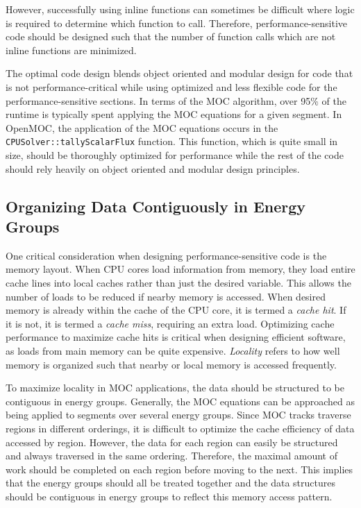 However, successfully using inline functions can sometimes be difficult where logic is required to determine which function to call. Therefore, performance-sensitive code should be designed such that the number of function calls which are not inline functions are minimized.

The optimal code design blends object oriented and modular design for code that is not performance-critical while using optimized and less flexible code for the performance-sensitive sections. In terms of the \ac{MOC} algorithm, over 95\% of the runtime is typically spent applying the \ac{MOC} equations for a given segment. In OpenMOC, the application of the \ac{MOC} equations occurs in the \texttt{CPUSolver::tallyScalarFlux} function. This function, which is quite small in size, should be thoroughly optimized for performance while the rest of the code should rely heavily on object oriented and modular design principles. 

\subsection{Organizing Data Contiguously in Energy Groups}

One critical consideration when designing performance-sensitive code is the memory layout. When CPU cores load information from memory, they load entire cache lines into local caches rather than just the desired variable. This allows the number of loads to be reduced if nearby memory is accessed. When desired memory is already within the cache of the CPU core, it is termed a \textit{cache hit}. If it is not, it is termed a \textit{cache miss}, requiring an extra load. Optimizing cache performance to maximize cache hits is critical when designing efficient software, as loads from main memory can be quite expensive. \textit{Locality} refers to how well memory is organized such that nearby or local memory is accessed frequently. 

To maximize locality in \ac{MOC} applications, the data should be structured to be contiguous in energy groups. Generally, the \ac{MOC} equations can be approached as being applied to segments over several energy groups. Since \ac{MOC} tracks traverse regions in different orderings, it is difficult to optimize the cache efficiency of data accessed by region. However, the data for each region can easily be structured and always traversed in the same ordering. Therefore, the maximal amount of work should be completed on each region before moving to the next. This implies that the energy groups should all be treated together and the data structures should be contiguous in energy groups to reflect this memory access pattern. 

